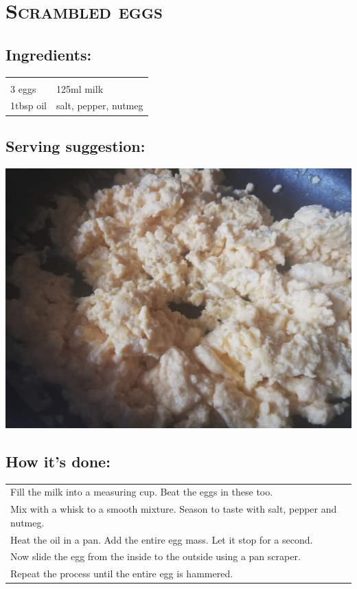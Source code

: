 \section{\textsc{Scrambled eggs}}

\subsection*{Ingredients:}

\begin{tabular}{p{7.5cm} p{7.5cm}}
	& \\
	3 eggs & 125ml milk \\
	1tbsp oil & salt, pepper, nutmeg
\end{tabular}

\subsection*{Serving suggestion:}

\includegraphics[width=\textwidth]{img/ruehrei/ruehrei_fertig.jpg} \cite{ruehrei}

\subsection*{How it's done:}

\begin{tabular}{p{15cm}}
	\\
  Fill the milk into a measuring cup. Beat the eggs in these too.\\
  Mix with a whisk to a smooth mixture. Season to taste with salt, pepper and nutmeg.\\
  Heat the oil in a pan. Add the entire egg mass. Let it stop for a second.\\
  Now slide the egg from the inside to the outside using a pan scraper.\\
  Repeat the process until the entire egg is hammered.
\end{tabular}
